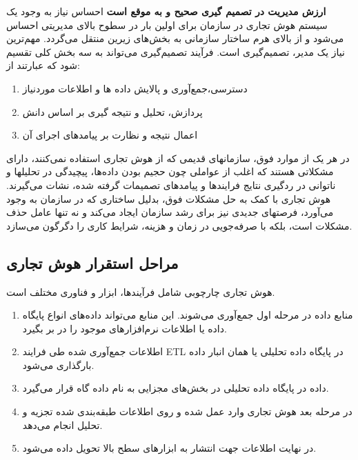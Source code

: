 \documentclass{llncs}
\begin{document}
\textbf{ارزش مدیریت در تصمیم گیری صحیح و به موقع است}
احساس نیاز به وجود یک سیستم هوش تجاری در سازمان برای اولین بار در سطوح بالای مدیریتی احساس می‌شود و از بالای هرم ساختار سازمانی به بخش‌های زیرین منتقل می‌گردد. مهم‌ترین نیاز یک مدیر، تصمیم‌گیری است. فرآیند تصمیم‌گیری می‌تواند به سه بخش کلی تقسیم شود که عبارتند از:
\begin{enumerate}
    \item دسترسی،جمع‌آوری و پالایش داده ها و اطلاعات موردنیاز
    \item پردازش، تحلیل و نتیجه گیری بر اساس دانش
    \item اعمال نتیجه و نظارت بر پیامدهای اجرای آن
\end{enumerate}
در هر یک از موارد فوق، سازمانهای قدیمی که از هوش تجاری استفاده نمی‌کنند، دارای مشکلاتی هستند که اغلب از عواملی چون حجیم بودن داده‌ها، پیچیدگی در تحلیلها و ناتوانی در ردگیری نتایج فرایندها و پیامدهای تصمیمات گرفته شده، نشات می‌گیرند. هوش تجاری با کمک به حل مشکلات فوق، بدلیل ساختاری که در سازمان به وجود می‌آورد، فرصتهای جدیدی نیز برای رشد سازمان ایجاد می‌کند و نه تنها عامل حذف مشکلات است، بلکه با صرفه‌جویی در زمان و هزینه، شرایط کاری را دگرگون می‌سازد.

\subsection{مراحل استقرار هوش تجاری}
هوش تجاری چارچوبی شامل فرآیندها، ابزار و فناوری مختلف است.
\begin{enumerate}
    \item منابع داده در مرحله اول جمع‌آوری می‌شوند. این منابع می‌تواند داده‌های انواع پایگاه داده یا اطلاعات نرم‌افزارهای موجود را در بر بگیرد.
    \item اطلاعات جمع‌آوری شده طی فرایند ETL در پایگاه داده تحلیلی یا همان انبار داده بارگذاری می‌شود.
    \item داده در پایگاه داده تحلیلی در بخش‌های مجزایی به نام داده گاه قرار می‌گیرد.
    \item در مرحله بعد هوش تجاری وارد عمل شده و روی اطلاعات طبقه‌بندی شده تجزیه و تحلیل انجام می‌دهد.
    \item در نهایت اطلاعات جهت انتشار به ابزارهای سطح بالا تحویل داده می‌شود.

\end{enumerate}
\end{document}
